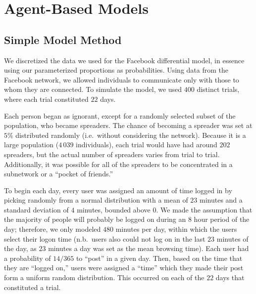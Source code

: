 \section{Agent-Based Models }
\label{sec:abmodel}

\subsection{Simple Model Method}
\label{subsec:abmodelsetup}

\noindent We discretized the data we used for the Facebook differential model,
in essence using our parameterized proportions as probabilities. Using data from
the Facebook network, we allowed individuals to communicate only with those to
whom they are connected. To simulate the model, we used $ 400 $ distinct trials,
where each trial constituted $ 22 $ days.

Each person began as ignorant, except for a randomly selected subset of the
population, who became spreaders. The chance of becoming a spreader was set at $
5\% $ distributed randomly (i.e.\ without considering the network). Because it is
a large population ($ 4\,039 $ individuals), each trial would have had around $
202 $ spreaders, but the actual number of spreaders varies from trial to trial.
Additionally,  it was possible for all of the spreaders to be concentrated in a
subnetwork or a ``pocket of friends.''

To begin each day, every user was assigned an amount of time logged in by
picking randomly from a normal distribution with a mean of $ 23 $ minutes and a
standard deviation of $ 4 $ minutes, bounded above $ 0 $. We made the assumption
that the majority of people will probably be logged on during an $8$ hour period
of the day; therefore, we only modeled $480$ minutes per day, within which the
users select their logon time (n.b.\ users also could not log on in the last $ 23 $
minutes of the day, as $ 23 $ minutes a day was set as the mean browsing time).
Each user had a probability of $14/365$ to ``post'' in a given day. Then, based
on the time that they are ``logged on,'' users were assigned a ``time'' which they
made their post form a uniform random distribution. This occurred on each of the $
22 $ days that constituted a trial.

